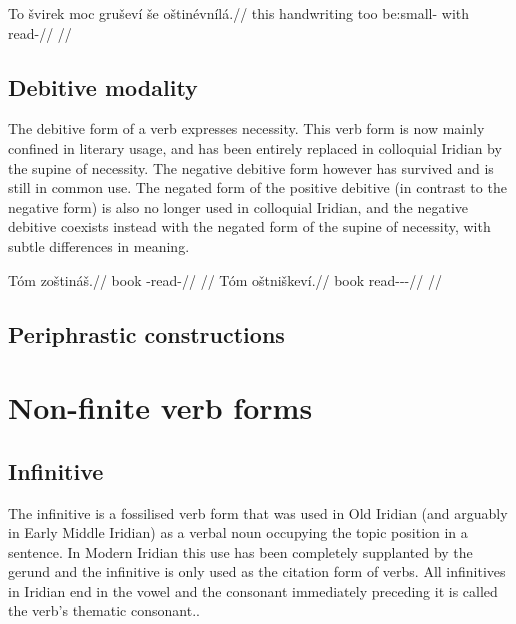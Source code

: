\pex
\begingl
\gla To švirek moc gruševí še oštinévnílá.//
\glb this handwriting too be:small- with read-//
\glft {}//
\endgl
\xe

\subsection{Debitive modality}

The debitive form of a verb expresses necessity. This verb form is now mainly confined in literary usage, and has been entirely replaced in colloquial Iridian by the supine of necessity. The negative debitive form however has survived and is still in common use. The negated form of the positive debitive (in contrast to the negative form) is also no longer used in colloquial Iridian, and the negative debitive coexists instead with the negated form of the supine of necessity, with subtle differences in meaning.

\begin{multicols}{2}
  \pex
  \a
  \begingl
  \gla Tóm zoštináš.//
  \glb book \Neg{}-read-\SupN{}//
  \glft {}//
  \endgl
  \a \begingl
  \gla Tóm oštniškeví.//
  \glb book read-\Pv{}-\Deb{}-\Cont{}//
  \glft {}//
  \endgl
  \xe
\end{multicols}

\subsection{Periphrastic constructions}

\section{Non-finite verb forms}

\subsection{Infinitive}\label{sec:infinitive}

The {\sc infinitive} is a fossilised verb form that was used in Old Iridian (and arguably in Early Middle Iridian) as a verbal noun occupying the topic position in a sentence. In Modern Iridian this use has been completely supplanted by the gerund and the infinitive is only used as the citation form of verbs. All infinitives in Iridian end in the vowel  and the consonant immediately preceding it is called the verb's thematic consonant..

